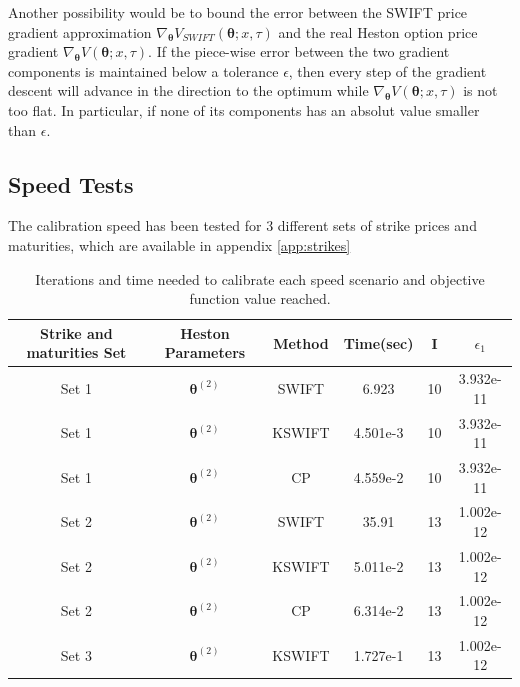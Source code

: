\documentclass[12,twoside]{mammeTFM}
\theoremstyle{definition}
\theoremstyle{remark}
\begin{document}
Another possibility would be to bound the error between the SWIFT price gradient approximation $\nabla_{\boldsymbol{\theta}}V_{SWIFT}(\boldsymbol{\theta}; x, \tau)$ and the real Heston option price gradient $\nabla_{\boldsymbol{\theta}}V(\boldsymbol{\theta}; x, \tau)$. If the piece-wise error between the two gradient components is maintained below a tolerance $\epsilon$, then every step of the gradient descent will advance in the direction to the optimum while $\nabla_{\boldsymbol{\theta}}V(\boldsymbol{\theta}; x, \tau)$ is not too flat. In particular, if none of its components has an absolut value smaller than $\epsilon$.

\subsection{Speed Tests}\label{subsec:speed}

The calibration speed has been tested for 3 different sets of strike prices and maturities, which are available in appendix \ref{app:strikes}

\begin{table}[!h]
\begin{center}
 \begin{tabular}{|c | c | c | c | c | c |} 
 \hline
 Strike and maturities Set & Heston Parameters & Method & Time(sec) & I & $\epsilon_1$ \\ [0.5ex] 
 \hline
 Set 1 & $\boldsymbol{\theta}^{(2)}$ & SWIFT & 6.923 & 10 & 3.932e-11 \\ 
 \hline
 Set 1 & $\boldsymbol{\theta}^{(2)}$ & KSWIFT & 4.501e-3 & 10 & 3.932e-11 \\
 \hline
 Set 1 & $\boldsymbol{\theta}^{(2)}$ & CP & 4.559e-2 & 10 & 3.932e-11 \\
 \hline
 Set 2 & $\boldsymbol{\theta}^{(2)}$ & SWIFT & 35.91 & 13 & 1.002e-12 \\
 \hline
 Set 2 & $\boldsymbol{\theta}^{(2)}$ & KSWIFT & 5.011e-2 & 13 & 1.002e-12 \\
 \hline
 Set 2 & $\boldsymbol{\theta}^{(2)}$ & CP & 6.314e-2 & 13 & 1.002e-12 \\
 \hline
 Set 3 & $\boldsymbol{\theta}^{(2)}$ & KSWIFT  & 1.727e-1 & 13 & 1.002e-12\\
 \hline
\end{tabular}
\caption{Iterations and time needed to calibrate each speed scenario and objective function value reached.}\label{table:speed}
\end{center}
\end{table}
\end{document}
